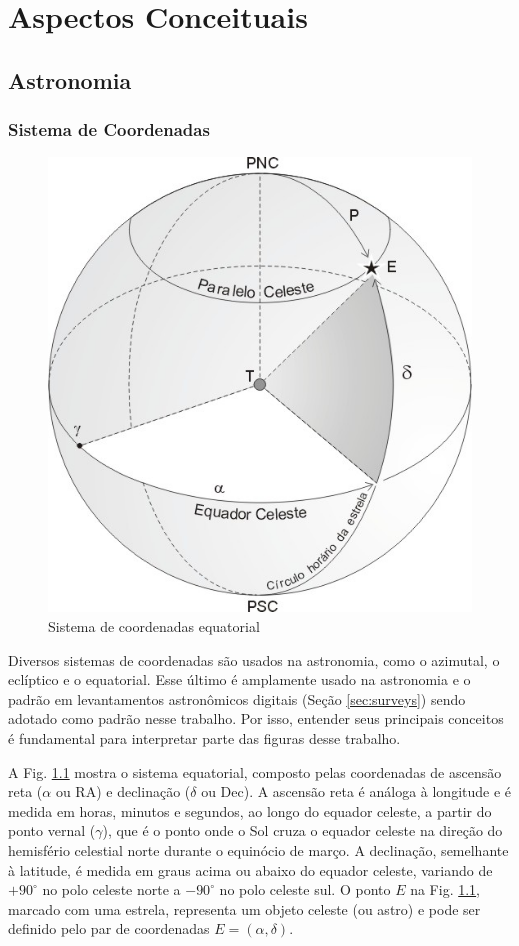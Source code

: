 \chapter{Aspectos Conceituais}
\label{cap:conceitos}

\section{Astronomia}
\label{sec:astro}


\subsection{Sistema de Coordenadas}
\label{sec:sistema-coordenadas}

\begin{figure}[!ht]
  \centering
  \caption{Sistema de coordenadas equatorial}
  \label{fig:sistema-equatorial}
  \includegraphics[width=0.58\linewidth]{figures/coords.png}
\end{figure}

Diversos sistemas de coordenadas são usados na astronomia, como o azimutal, o eclíptico e o equatorial. Esse último é amplamente usado na astronomia e o padrão em levantamentos astronômicos digitais (Seção \ref{sec:surveys}) sendo adotado como padrão nesse trabalho. Por isso, entender seus principais conceitos é fundamental para interpretar parte das figuras desse trabalho.

A Fig. \ref{fig:sistema-equatorial} mostra o sistema equatorial, composto pelas coordenadas de ascensão reta ($\alpha$ ou RA) e declinação ($\delta$ ou Dec). A ascensão reta é análoga à longitude e é medida em horas, minutos e segundos, ao longo do equador celeste, a partir do ponto vernal ($\gamma$), que é o ponto onde o Sol cruza o equador celeste na direção do hemisfério celestial norte durante o equinócio de março. A declinação, semelhante à latitude, é medida em graus acima ou abaixo do equador celeste, variando de $+90^{\circ}$ no polo celeste norte a $-90^{\circ}$ no polo celeste sul. O ponto $E$ na Fig. \ref{fig:sistema-equatorial}, marcado com uma estrela, representa um objeto celeste (ou astro) e pode ser definido pelo par de coordenadas $E = (\alpha, \delta)$.

